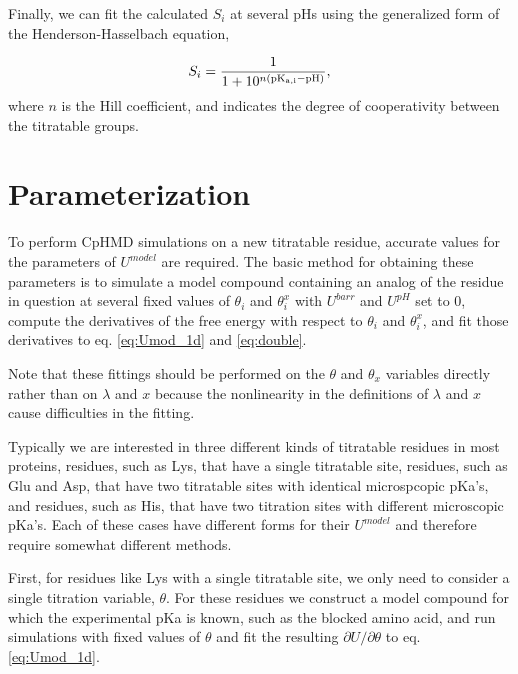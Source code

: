 \documentclass[9pt,tutorial]{livecoms}
\begin{document}
Finally, we can fit the calculated $S_i$ at several pHs using the generalized form of the Henderson-Hasselbach equation,

\begin{equation}
S_i = \frac{1}{1+10^{n(\rm pK_{a,i} - pH)}},
\end{equation}
where $n$ is the Hill coefficient, and indicates the degree of cooperativity between the titratable groups. 




\section{Parameterization} %
To perform CpHMD simulations on a new titratable residue, accurate values for the parameters of $U^{model}$ are required. The basic method for obtaining these parameters is to simulate a model compound containing an analog of the residue in question at several fixed values of $\theta_{i}$ and $\theta^{x}_{i}$ with $U^{barr}$ and $U^{pH}$ set to 0, compute the derivatives of the free energy with respect to $\theta_{i}$ and $\theta^{x}_{i}$, and fit those derivatives to eq. \ref{eq:Umod_1d} and \ref{eq:double}.

Note that these fittings should be performed on the $\theta$ and $\theta_{x}$ variables directly rather than on $\lambda$ and $x$ because the nonlinearity in the definitions of $\lambda$ and $x$ cause difficulties in the fitting.

Typically we are interested in three different kinds of titratable residues in most proteins, residues, such as Lys, that have a single titratable site, residues, such as Glu and Asp, that have two titratable sites with identical microspcopic pKa's, and residues, such as His, that have two titration sites with different microscopic pKa's. Each of these cases have different forms for their $U^{model}$ and therefore require somewhat different methods.

First, for residues like Lys with a single titratable site, we only need to consider a single titration variable, $\theta$. For these residues we construct a model compound for which the experimental pKa is known, such as the blocked amino acid, and run simulations with fixed values of $\theta$ and fit the resulting $\partial U/\partial\theta$ to eq. \ref{eq:Umod_1d}.
\end{document}
